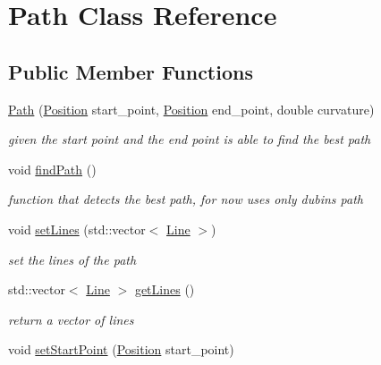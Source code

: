 \hypertarget{class_path}{}\section{Path Class Reference}
\label{class_path}
\subsection*{Public Member Functions}
\begin{DoxyCompactItemize}
\item 
\mbox{\hyperlink{class_path_aeea7a8be1048b133042de6815a5c3814}{Path}} (\mbox{\hyperlink{class_position}{Position}} start\+\_\+point, \mbox{\hyperlink{class_position}{Position}} end\+\_\+point, double curvature)
\begin{DoxyCompactList}\small\item\em given the start point and the end point is able to find the best path \end{DoxyCompactList}\item 
\mbox{\label{class_path_ab45faf702862c6594068a3ed2d026cda}} 
void \mbox{\hyperlink{class_path_ab45faf702862c6594068a3ed2d026cda}{find\+Path}} ()
\begin{DoxyCompactList}\small\item\em function that detects the best path, for now uses only dubins path \end{DoxyCompactList}\item 
\mbox{\label{class_path_ae5b5816b3480e9f103079bb3467dc65f}} 
void \mbox{\hyperlink{class_path_ae5b5816b3480e9f103079bb3467dc65f}{set\+Lines}} (std\+::vector$<$ \mbox{\hyperlink{class_line}{Line}} $>$)
\begin{DoxyCompactList}\small\item\em set the lines of the path \end{DoxyCompactList}\item 
std\+::vector$<$ \mbox{\hyperlink{class_line}{Line}} $>$ \mbox{\hyperlink{class_path_aff0072e2e1cf183ba6fc240cd85045e2}{get\+Lines}} ()
\begin{DoxyCompactList}\small\item\em return a vector of lines \end{DoxyCompactList}\item 
void \mbox{\hyperlink{class_path_a87f4082a3c5af3aa37260cb99c605156}{set\+Start\+Point}} (\mbox{\hyperlink{class_position}{Position}} start\+\_\+point)

\end{DoxyCompactItemize}
